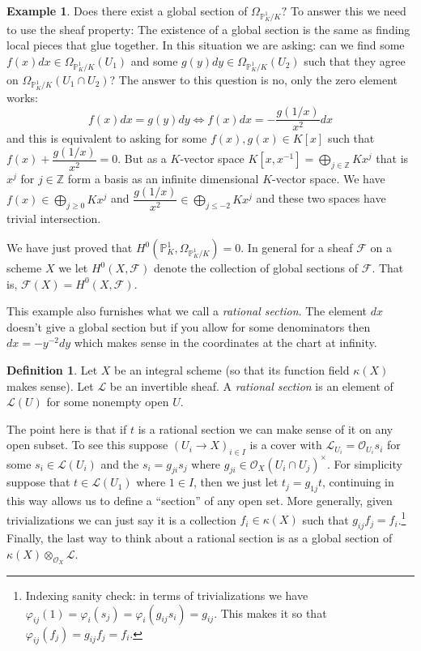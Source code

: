 \documentclass[12pt]{article}
\numberwithin{equation}{section}
\theoremstyle{definition}
\newtheorem{definition}[theorem]{Definition}
\newtheorem{example}[theorem]{Example}
\theoremstyle{remark}
\newcommand{\ZZ}{\mathbb{Z}}
\newcommand{\Ocal}{\mathcal{O}}
\newcommand{\PP}{\mathbb{P}}
\newcommand{\Lcal}{\mathcal{L}}
\newcommand{\Fcal}{\mathcal{F}}
\begin{document}
\begin{example}
	Does there exist a global section of $\Omega_{\PP^1_K/K}?$ 
	To answer this we need to use the sheaf property:
	The existence of a global section is the same as finding local pieces that glue together. In this situation we are asking: can we find some $f(x) dx \in \Omega_{\PP^1_K/K}(U_1)$ and some $g(y) dy \in \Omega_{\PP^1_K/K}(U_2)$ such that they agree on $\Omega_{\PP^1_K/K}(U_1\cap U_2)$?
	The answer to this question is no, only the zero element works:
		$$f(x)dx = g(y) dy \iff f(x)dx =-\dfrac{g(1/x)}{x^2} dx$$
	and this is equivalent to asking for some $f(x),g(x) \in K[x]$ such that $f(x) + \dfrac{g(1/x)}{x^2}=0$.
	But as a $K$-vector space $K[x,x^{-1}] = \bigoplus_{j\in \ZZ} K x^j$ that is $x^j$ for $j\in \ZZ$ form a basis as an infinite dimensional $K$-vector space.
	We have $f(x) \in \bigoplus_{j \geq 0} Kx^j$ and $\dfrac{g(1/x)}{x^2} \in \bigoplus_{j\leq -2 } K x^j$ and these two spaces have trivial intersection.
\end{example}

We have just proved that $H^0(\PP^1_K,\Omega_{\PP^1_K/K})=0$. 
In general for a sheaf $\Fcal$ on a scheme $X$ we let $H^0(X,\Fcal)$ denote the collection of global sections of $\Fcal$. That is, $\Fcal(X) = H^0(X,\Fcal)$.

This example also furnishes what we call a \emph{rational section}. 
The element $dx$ doesn't give a global section but if you allow for some denominators then $dx=-y^{-2}dy$ which makes sense in the coordinates at the chart at infinity.

\begin{definition}
Let $X$ be an integral scheme (so that its function field $\kappa(X)$ makes sense).
Let $\Lcal$ be an invertible sheaf. 
A \emph{rational section} is an element of $\Lcal(U)$ for some nonempty open $U$. 
\end{definition}
The point here is that if $t$ is a rational section we can make sense of it on any open subset. 
To see this suppose $(U_i \to X)_{i\in I}$ is a cover with $\Lcal_{U_i} = \Ocal_{U_i} s_i$ for some $s_i \in \Lcal(U_i)$ and the $s_i = g_{ji} s_j$ where $g_{ji} \in \Ocal_X(U_i \cap U_j)^{\times}$. 
For simplicity suppose that $t \in \Lcal(U_1)$ where $1\in I$, then we just let $t_{j} = g_{1j}t$, continuing in this way allows us to define a ``section'' of any open set.
More generally, given trivializations we can just say it is a collection $f_i \in \kappa(X)$ such that $ g_{ij}f_j=f_i$.\footnote{Indexing sanity check: in terms of trivializations we have $\varphi_{ij}(1) = \varphi_i(s_j) =  \varphi_i(g_{ij}s_i) = g_{ij}$.  This makes it so that $\varphi_{ij}(f_j) = g_{ij}f_j = f_i.$}
Finally, the last way to think about a rational section is as a global section of $\kappa(X) \otimes_{\Ocal_X} \Lcal$.
\end{document}
